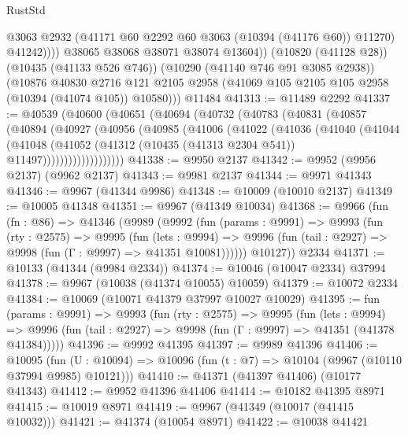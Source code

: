 \begin{lexlean}{RustStd}
\begin{coremodule}
                  @3063
                  @2932
                  (@41171 @60 @2292 @60 @3063 (@10394 (@41176 @60)) @11270)
                  @41242))))
          @38065
          @38068
          @38071
          @38074
          @13604))
      (@10820 (@41128 @28))
      (@10435 (@41133 @526 @746))
      (@10290 (@41140 @746 @91 @3085 @2938))
      (@10876
        @40830
        @2716
        @121
        @2105
        @2958
        (@41069 @105 @2105 @105 @2958 (@10394 (@41074 @105)) @10580)))
    @11484
@41313 := @11489 @2292
@41337 := @40539
    (@40600
      (@40651
        (@40694
          (@40732
            (@40783
              (@40831
                (@40857
                  (@40894
                    (@40927
                      (@40956
                        (@40985
                          (@41006
                            (@41022
                              (@41036
                                (@41040
                                  (@41044
                                    (@41048
                                      (@41052
                                        (@41312
                                          (@10435 (@41313 @2304 @541))
                                          @11497)))))))))))))))))))
@41338 := @9950 @2137
@41342 := @9952 (@9956 @2137) (@9962 @2137)
@41343 := @9981 @2137
@41344 := @9971 @41343
@41346 := @9967 (@41344 @9986)
@41348 := @10009 (@10010 @2137)
@41349 := @10005 @41348
@41351 := @9967 (@41349 @10034)
@41368 := @9966
    (fun (fn : @86) =>
    @41346
      (@9989
        (@9992
          (fun (params : @9991) =>
          @9993
            (fun (rty : @2575) =>
            @9995
              (fun (lets : @9994) =>
              @9996 (fun (tail : @2927) => @9998 (fun (Γ : @9997) => @41351 @10081))))))
        @10127))
    @2334
@41371 := @10133 (@41344 (@9984 @2334))
@41374 := @10046 (@10047 @2334) @37994
@41378 := @9967 (@10038 (@41374 @10055) @10059)
@41379 := @10072 @2334
@41384 := @10069 (@10071 @41379 @37997 @10027 @10029)
@41395 := fun (params : @9991) =>
  @9993
    (fun (rty : @2575) =>
    @9995
      (fun (lets : @9994) =>
      @9996 (fun (tail : @2927) => @9998 (fun (Γ : @9997) => @41351 (@41378 @41384)))))
@41396 := @9992 @41395
@41397 := @9989 @41396
@41406 := @10095
    (fun (U : @10094) => @10096 (fun (t : @7) => @10104 (@9967 (@10110 @37994 @9985) @10121)))
@41410 := @41371 (@41397 @41406) (@10177 @41343)
@41412 := @9952 @41396 @41406
@41414 := @10182 @41395 @8971
@41415 := @10019 @8971
@41419 := @9967 (@41349 (@10017 (@41415 @10032)))
@41421 := @41374 (@10054 @8971)
@41422 := @10038 @41421

\end{coremodule}
\end{lexlean}
